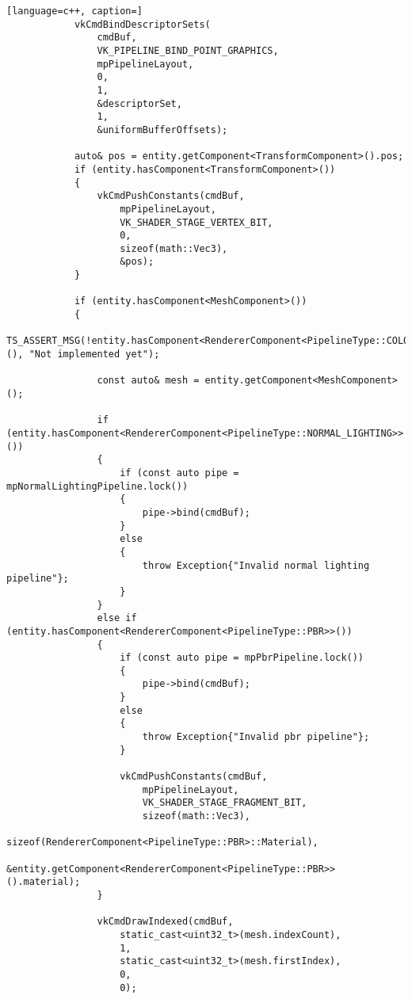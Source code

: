 \begin{itemize}
\begin{lstlisting}[language=c++, caption=]
            vkCmdBindDescriptorSets(
                cmdBuf,
                VK_PIPELINE_BIND_POINT_GRAPHICS,
                mpPipelineLayout,
                0,
                1,
                &descriptorSet,
                1,
                &uniformBufferOffsets);

            auto& pos = entity.getComponent<TransformComponent>().pos;
            if (entity.hasComponent<TransformComponent>())
            {
                vkCmdPushConstants(cmdBuf,
                    mpPipelineLayout,
                    VK_SHADER_STAGE_VERTEX_BIT,
                    0,
                    sizeof(math::Vec3),
                    &pos);
            }

            if (entity.hasComponent<MeshComponent>())
            {
                TS_ASSERT_MSG(!entity.hasComponent<RendererComponent<PipelineType::COLOR>>(), "Not implemented yet");

                const auto& mesh = entity.getComponent<MeshComponent>();

                if (entity.hasComponent<RendererComponent<PipelineType::NORMAL_LIGHTING>>())
                {
                    if (const auto pipe = mpNormalLightingPipeline.lock())
                    {
                        pipe->bind(cmdBuf);
                    }
                    else
                    {
                        throw Exception{"Invalid normal lighting pipeline"};
                    }
                }
                else if (entity.hasComponent<RendererComponent<PipelineType::PBR>>())
                {
                    if (const auto pipe = mpPbrPipeline.lock())
                    {
                        pipe->bind(cmdBuf);
                    }
                    else
                    {
                        throw Exception{"Invalid pbr pipeline"};
                    }
                
                    vkCmdPushConstants(cmdBuf,
                        mpPipelineLayout,
                        VK_SHADER_STAGE_FRAGMENT_BIT,
                        sizeof(math::Vec3),
                        sizeof(RendererComponent<PipelineType::PBR>::Material),
                        &entity.getComponent<RendererComponent<PipelineType::PBR>>().material);
                }

                vkCmdDrawIndexed(cmdBuf,
                    static_cast<uint32_t>(mesh.indexCount),
                    1,
                    static_cast<uint32_t>(mesh.firstIndex),
                    0,
                    0);


\end{lstlisting}
\end{itemize}
